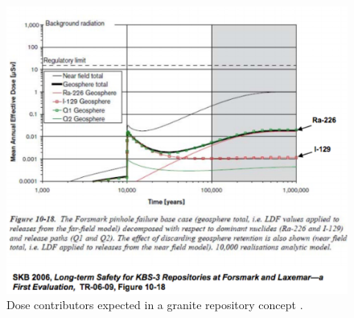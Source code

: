 \begin{figure}[htbp!]
  \begin{center}
    \includegraphics[width=0.7\textheight]{swift_granite_dose.eps}
  \end{center}
  \caption{Dose contributors expected in a granite repository concept 
    \cite{swift_applying_2010}.}
  \label{fig:swift_granite_dose}
\end{figure}
